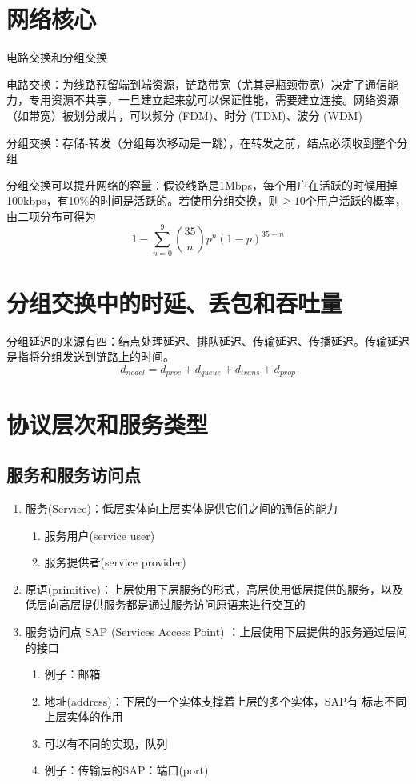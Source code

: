 \documentclass[]{report}
\begin{document}
	\section{网络核心}
		电路交换和分组交换\par
		电路交换：为线路预留端到端资源，链路带宽（尤其是瓶颈带宽）决定了通信能力，专用资源不共享，一旦建立起来就可以保证性能，需要建立连接。网络资源（如带宽）被划分成片，可以频分 (FDM)、时分 (TDM)、波分 (WDM)\par
		分组交换：存储-转发（分组每次移动是一跳），在转发之前，结点必须收到整个分组\par
		分组交换可以提升网络的容量：假设线路是1Mbps，每个用户在活跃的时候用掉100kbps，有10\%的时间是活跃的。若使用分组交换，则$\ge10$个用户活跃的概率，由二项分布可得为\[1-\sum_{n=0}^9{35\choose n}p^n(1-p)^{35-n}\]
	\section{分组交换中的时延、丢包和吞吐量}
		分组延迟的来源有四：结点处理延迟、排队延迟、传输延迟、传播延迟。传输延迟是指将分组发送到链路上的时间。
		\[d_{nodel}=d_{proc}+d_{queue}+d_{trans}+d_{prop}\]\par
	\section{协议层次和服务类型}
		\subsection{服务和服务访问点}
		\begin{enumerate}
			\item 服务(Service)：低层实体向上层实体提供它们之间的通信的能力
			\begin{enumerate}
				\item 服务用户(service user)
				\item 服务提供者(service provider)
			\end{enumerate}
			\item 原语(primitive)：上层使用下层服务的形式，高层使用低层提供的服务，以及低层向高层提供服务都是通过服务访问原语来进行交互的
			\item 服务访问点 SAP (Services Access Point) ：上层使用下层提供的服务通过层间的接口
			\begin{enumerate}
				\item 例子：邮箱
				\item 地址(address)：下层的一个实体支撑着上层的多个实体，SAP有
				标志不同上层实体的作用
				\item 可以有不同的实现，队列
				\item 例子：传输层的SAP：端口(port)
			\end{enumerate}
		\end{enumerate}
\end{document}
